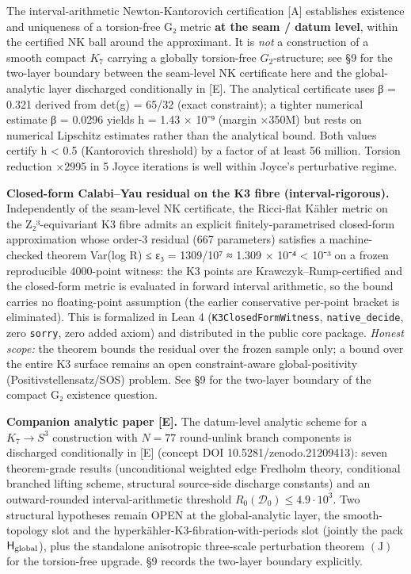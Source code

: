 \documentclass[11pt,a4paper]{article}
\begin{document}
The interval-arithmetic Newton-Kantorovich certification {[}A{]} establishes existence and uniqueness of a torsion-free G₂ metric \textbf{at the seam / datum level}, within the certified NK ball around the approximant. It is \emph{not} a construction of a smooth compact \(K_7\) carrying a globally torsion-free \(G_2\)-structure; see §9 for the two-layer boundary between the seam-level NK certificate here and the global-analytic layer discharged conditionally in {[}E{]}. The analytical certificate uses β = 0.321 derived from det(g) = 65/32 (exact constraint); a tighter numerical estimate β = 0.0296 yields h = 1.43 × 10⁻⁹ (margin ×350M) but rests on numerical Lipschitz estimates rather than the analytical bound. Both values certify h \textless{} 0.5 (Kantorovich threshold) by a factor of at least 56 million. Torsion reduction ×2995 in 5 Joyce iterations is well within Joyce's perturbative regime.

\textbf{Closed-form Calabi--Yau residual on the K3 fibre (interval-rigorous).} Independently of the seam-level NK certificate, the Ricci-flat Kähler metric on the Z₂³-equivariant K3 fibre admits an explicit finitely-parametrised closed-form approximation whose order-3 residual (667 parameters) satisfies a machine-checked theorem Var(log R) ≤ ε₃ = 1309/10⁷ ≈ 1.309 × 10⁻⁴ \textless{} 10⁻³ on a frozen reproducible 4000-point witness: the K3 points are Krawczyk--Rump-certified and the closed-form metric is evaluated in forward interval arithmetic, so the bound carries no floating-point assumption (the earlier conservative per-point bracket is eliminated). This is formalized in Lean 4 (\texttt{K3Closed\allowbreak{}Form\allowbreak{}Witness}, \texttt{native\_\allowbreak{}decide}, zero \texttt{sorry}, zero added axiom) and distributed in the public core package. \emph{Honest scope:} the theorem bounds the residual over the frozen sample only; a bound over the entire K3 surface remains an open constraint-aware global-positivity (Positivstellensatz/SOS) problem. See §9 for the two-layer boundary of the compact G₂ existence question.

\textbf{Companion analytic paper {[}E{]}.} The datum-level analytic scheme for a \(K_7 \to S^3\) construction with \(N = 77\) round-unlink branch components is discharged conditionally in {[}E{]} (concept DOI 10.5281/zenodo.21209413): seven theorem-grade results (unconditional weighted edge Fredholm theory, conditional branched lifting scheme, structural source-side discharge constants) and an outward-rounded interval-arithmetic threshold \(R_0(\mathcal D_0) \le 4.9 \cdot 10^3\). Two structural hypotheses remain OPEN at the global-analytic layer, the smooth-topology slot and the hyperkähler-K3-fibration-with-periods slot (jointly the pack \(\mathsf H_{\rm global}\)), plus the standalone anisotropic three-scale perturbation theorem \((\mathrm J)\) for the torsion-free upgrade. §9 records the two-layer boundary explicitly.
\end{document}
